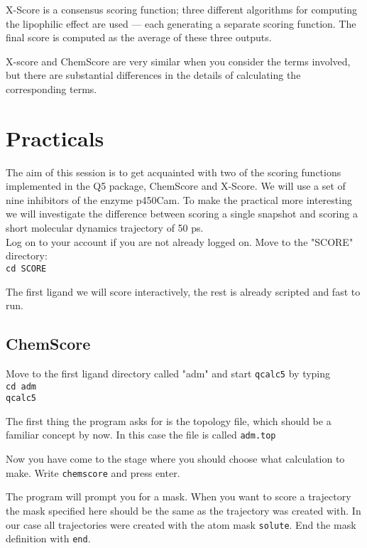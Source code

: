 \documentclass[a4paper,12pt]{article}
\newcommand{\qcalc}{\texttt{qcalc5}}
\begin{document}
X-Score is a consensus scoring function; three different
algorithms for computing the lipophilic effect are used --- each
generating a separate scoring function. The final score is
computed as the average of these three outputs.

X-score and ChemScore are very similar when you consider the terms
involved, but there are substantial differences in the details of
calculating the corresponding terms.



\section{Practicals}

The aim of this session is to get acquainted with two of the
scoring functions implemented in the Q5 package, ChemScore and
X-Score. We will use a set of nine inhibitors of the enzyme
p450Cam. To make the practical more interesting we will
investigate the difference between scoring a single snapshot and
scoring a short molecular dynamics trajectory of 50 ps. \\

\noindent Log on to your account if you are not already logged on.
Move to the "SCORE" directory:\\
 \texttt{cd SCORE}

\noindent The first ligand we will score interactively, the rest
is already scripted and fast to run.

\subsection {ChemScore}

Move to the first ligand directory called "adm" and start {\qcalc}
by
typing\\
 \texttt{cd adm} \\
 \qcalc %

\noindent The first thing the program asks for is the topology
file, which should be a familiar concept by now. In this case the
file is called \texttt{adm.top}

\noindent Now you have come to the stage where you should choose
what calculation to make. Write \texttt{chemscore} and press
enter.

\noindent The program will prompt you for a mask. When you want to
score a trajectory the mask specified here should be the same as
the trajectory was created with. In our case all trajectories were
created with the atom mask \texttt{solute}. End the mask
definition with \texttt{end}.
\end{document}
